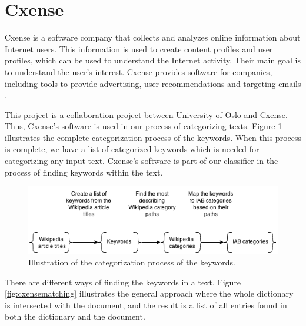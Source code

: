 \section{Cxense}
\label{sec:cxense}



Cxense is a software company that collects and analyzes online information about Internet users. This information is used to create content profiles and user profiles, which can be used to understand the Internet activity. Their main goal is to understand the user's interest. Cxense provides software for companies, including tools to provide advertising, user recommendations and targeting emails \cite{aboutcxense}.

This project is a collaboration project between University of Oslo and Cxense. Thus, Cxense's software is used in our process of categorizing texts. Figure \ref{fig:categorization_figure} illustrates the complete categorization process of the keywords. When this process is complete, we have a list of categorized keywords which is needed for categorizing any input text. Cxense's software is part of our classifier in the process of finding keywords within the text. 
\begin{figure}[h]
\centering
\includegraphics[width=\textwidth]{Chapters/Background/Categorization_figure}
\caption[The categorization process of the keywords]{Illustration of the categorization process of the keywords.}
\label{fig:categorization_figure}
\end{figure}

There are different ways of finding the keywords in a text. Figure \ref{fig:cxensematching} illustrates the general approach where the whole dictionary is intersected with the document, and the result is a list of all entries found in both the dictionary and the document. 

